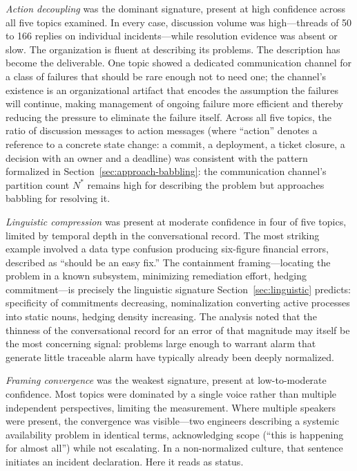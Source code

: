 \documentclass[11pt,a4paper]{article}
\begin{document}
\emph{Action decoupling} was the dominant signature, present at high confidence across all five topics examined. In every case, discussion volume was high---threads of 50 to 166 replies on individual incidents---while resolution evidence was absent or slow. The organization is fluent at describing its problems. The description has become the deliverable. One topic showed a dedicated communication channel for a class of failures that should be rare enough not to need one; the channel's existence is an organizational artifact that encodes the assumption the failures will continue, making management of ongoing failure more efficient and thereby reducing the pressure to eliminate the failure itself. Across all five topics, the ratio of discussion messages to action messages (where ``action'' denotes a reference to a concrete state change: a commit, a deployment, a ticket closure, a decision with an owner and a deadline) was consistent with the pattern formalized in Section~\ref{sec:approach-babbling}: the communication channel's partition count $N^*$ remains high for describing the problem but approaches babbling for resolving it.

\emph{Linguistic compression} was present at moderate confidence in four of five topics, limited by temporal depth in the conversational record. The most striking example involved a data type confusion producing six-figure financial errors, described as ``should be an easy fix.'' The containment framing---locating the problem in a known subsystem, minimizing remediation effort, hedging commitment---is precisely the linguistic signature Section~\ref{sec:linguistic} predicts: specificity of commitments decreasing, nominalization converting active processes into static nouns, hedging density increasing. The analysis noted that the thinness of the conversational record for an error of that magnitude may itself be the most concerning signal: problems large enough to warrant alarm that generate little traceable alarm have typically already been deeply normalized.

\emph{Framing convergence} was the weakest signature, present at low-to-moderate confidence. Most topics were dominated by a single voice rather than multiple independent perspectives, limiting the measurement. Where multiple speakers were present, the convergence was visible---two engineers describing a systemic availability problem in identical terms, acknowledging scope (``this is happening for almost all'') while not escalating. In a non-normalized culture, that sentence initiates an incident declaration. Here it reads as status.
\end{document}
